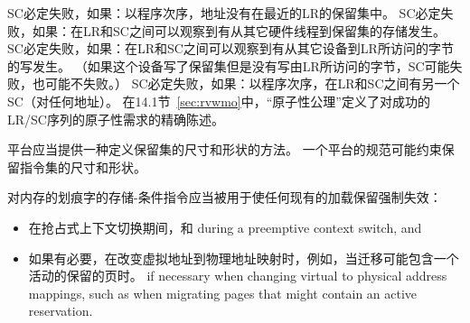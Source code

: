 SC必定失败，如果：以程序次序，地址没有在最近的LR的保留集中。
SC必定失败，如果：在LR和SC之间可以观察到有从其它硬件线程到保留集的存储发生。
SC必定失败，如果：在LR和SC之间可以观察到有从其它设备到LR所访问的字节的写发生。
（如果这个设备写了保留集但是没有写由LR所访问的字节，SC可能失败，也可能不失败。）
SC必定失败，如果：以程序次序，在LR和SC之间有另一个SC（对任何地址）。
在14.1节~\ref{sec:rvwmo}中，“原子性公理”定义了对成功的LR/SC序列的原子性需求的精确陈述。

\begin{commentary}
  平台应当提供一种定义保留集的尺寸和形状的方法。
  一个平台的规范可能约束保留指令集的尺寸和形状。
\end{commentary}

\begin{commentary}
  对内存的划痕字的存储-条件指令应当被用于使任何现有的加载保留强制失效：
\begin{itemize}
\item 在抢占式上下文切换期间，和   during a preemptive context switch, and
\item 如果有必要，在改变虚拟地址到物理地址映射时，例如，当迁移可能包含一个活动的保留的页时。  if necessary when changing virtual to physical address mappings,
  such as when migrating pages that might contain an active reservation.
\end{itemize}
\end{commentary}

